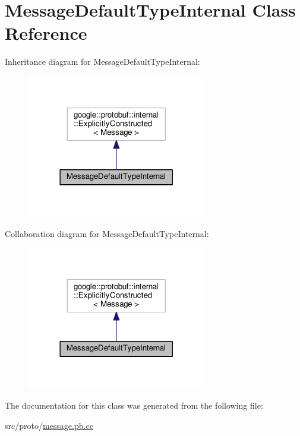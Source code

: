 \hypertarget{class_message_default_type_internal}{}\section{Message\+Default\+Type\+Internal Class Reference}
\label{class_message_default_type_internal}


Inheritance diagram for Message\+Default\+Type\+Internal\+:
\nopagebreak
\begin{figure}[H]
\begin{center}
\leavevmode
\includegraphics[width=222pt]{class_message_default_type_internal__inherit__graph}
\end{center}
\end{figure}


Collaboration diagram for Message\+Default\+Type\+Internal\+:
\nopagebreak
\begin{figure}[H]
\begin{center}
\leavevmode
\includegraphics[width=222pt]{class_message_default_type_internal__coll__graph}
\end{center}
\end{figure}


The documentation for this class was generated from the following file\+:\begin{DoxyCompactItemize}
\item 
src/proto/\hyperlink{message_8pb_8cc}{message.\+pb.\+cc}\end{DoxyCompactItemize}
